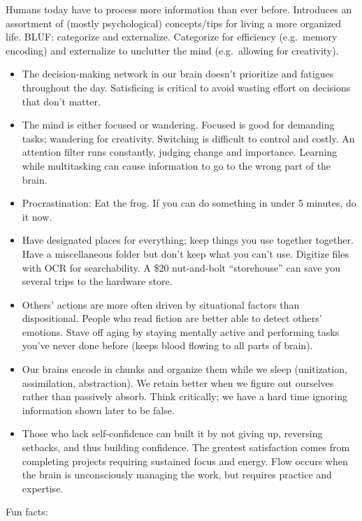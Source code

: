 \documentclass[
]{article}
\begin{document}
Humans today have to process more information than ever before.
Introduces an assortment of (mostly psychological) concepts/tips for
living a more organized life. BLUF: categorize and externalize.
Categorize for efficiency (e.g.~memory encoding) and externalize to
unclutter the mind (e.g.~allowing for creativity).

\begin{itemize}
\item
  The decision-making network in our brain doesn't prioritize and
  fatigues throughout the day. Satisficing is critical to avoid wasting
  effort on decisions that don't matter.
\item
  The mind is either focused or wandering. Focused is good for demanding
  tasks; wandering for creativity. Switching is difficult to control and
  costly. An attention filter runs constantly, judging change and
  importance. Learning while multitasking can cause information to go to
  the wrong part of the brain.
\item
  Procrastination: Eat the frog. If you can do something in under 5
  minutes, do it now.
\item
  Have designated places for everything; keep things you use together
  together. Have a miscellaneous folder but don't keep what you can't
  use. Digitize files with OCR for searchability. A \$20 nut-and-bolt
  ``storehouse'' can save you several trips to the hardware store.
\item
  Others' actions are more often driven by situational factors than
  dispositional. People who read fiction are better able to detect
  others' emotions. Stave off aging by staying mentally active and
  performing tasks you've never done before (keeps blood flowing to all
  parts of brain).
\item
  Our brains encode in chunks and organize them while we sleep
  (unitization, assimilation, abstraction). We retain better when we
  figure out ourselves rather than passively absorb. Think critically;
  we have a hard time ignoring information shown later to be false.
\item
  Those who lack self-confidence can built it by not giving up,
  reversing setbacks, and thus building confidence. The greatest
  satisfaction comes from completing projects requiring sustained focus
  and energy. Flow occurs when the brain is unconsciously managing the
  work, but requires practice and expertise.
\end{itemize}

Fun facts:
\end{document}
